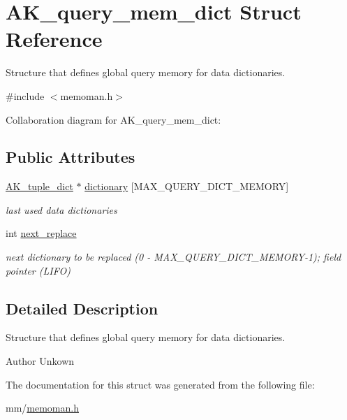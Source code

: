 \hypertarget{structAK__query__mem__dict}{}\section{A\+K\+\_\+query\+\_\+mem\+\_\+dict Struct Reference}
\label{structAK__query__mem__dict}


Structure that defines global query memory for data dictionaries.  




{\ttfamily \#include $<$memoman.\+h$>$}



Collaboration diagram for A\+K\+\_\+query\+\_\+mem\+\_\+dict\+:
\subsection*{Public Attributes}
\begin{DoxyCompactItemize}
\item 
\hyperlink{structAK__tuple__dict}{A\+K\+\_\+tuple\+\_\+dict} $\ast$ \hyperlink{structAK__query__mem__dict_a7345f65af9aecdbb66a14d6e81a8b012}{dictionary} \mbox{[}M\+A\+X\+\_\+\+Q\+U\+E\+R\+Y\+\_\+\+D\+I\+C\+T\+\_\+\+M\+E\+M\+O\+RY\mbox{]}\hypertarget{structAK__query__mem__dict_a7345f65af9aecdbb66a14d6e81a8b012}{}\label{structAK__query__mem__dict_a7345f65af9aecdbb66a14d6e81a8b012}

\begin{DoxyCompactList}\small\item\em last used data dictionaries \end{DoxyCompactList}\item 
int \hyperlink{structAK__query__mem__dict_a9029c5332af6a016de520e13889a846f}{next\+\_\+replace}\hypertarget{structAK__query__mem__dict_a9029c5332af6a016de520e13889a846f}{}\label{structAK__query__mem__dict_a9029c5332af6a016de520e13889a846f}

\begin{DoxyCompactList}\small\item\em next dictionary to be replaced (0 -\/ M\+A\+X\+\_\+\+Q\+U\+E\+R\+Y\+\_\+\+D\+I\+C\+T\+\_\+\+M\+E\+M\+O\+R\+Y-\/1); field pointer (L\+I\+FO) \end{DoxyCompactList}\end{DoxyCompactItemize}


\subsection{Detailed Description}
Structure that defines global query memory for data dictionaries. 

\begin{DoxyAuthor}{Author}
Unkown 
\end{DoxyAuthor}


The documentation for this struct was generated from the following file\+:\begin{DoxyCompactItemize}
\item 
mm/\hyperlink{memoman_8h}{memoman.\+h}\end{DoxyCompactItemize}
